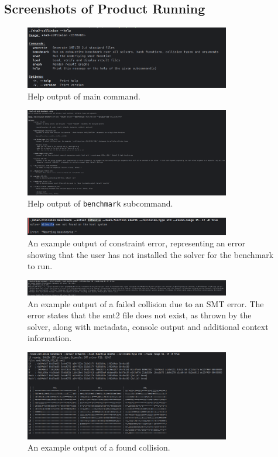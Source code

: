 \documentclass[a4paper]{report}
\begin{document}
\begin{appendices}
	\chapter{Screenshots of Product Running}
	\label{chap:usage-example}
	\begin{figure}[H]
		\centering
		\includegraphics[width=0.8\textwidth]{sha2-collision-help}
		\caption{Help output of main command.}
	\end{figure}
	\begin{figure}[H]
		\centering
		\includegraphics[width=0.8\textwidth]{sha2-collision-benchmark-help}
		\caption{Help output of \texttt{benchmark} subcommand.}
	\end{figure}
	\begin{figure}[H]
		\centering
		\includegraphics[width=0.8\textwidth]{sha2-fail}
		\caption{An example output of constraint error, representing an error showing that the user has not installed the solver for the benchmark to run.}
	\end{figure}
	\begin{figure}[H]
		\centering
		\includegraphics[width=0.8\textwidth]{sha2-smt-err}
		\caption{An example output of a failed collision due to an SMT error. The error states that the smt2 file does not exist, as thrown by the solver, along with metadata, console output and additional context information.}
	\end{figure}
	\begin{figure}[H]
		\centering
		\includegraphics[width=0.8\textwidth]{sha2-collision}
		\caption{An example output of a found collision.}
	\end{figure}



\end{appendices}
\end{document}
